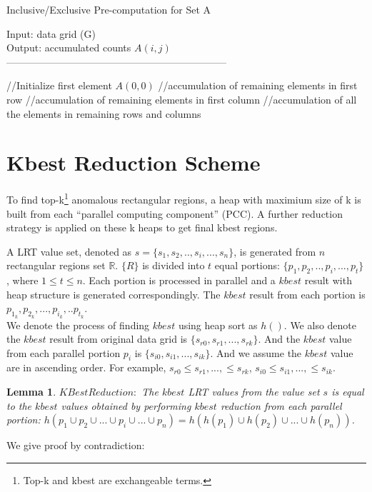 \documentclass[10pt,journal,cspaper,compsoc]{IEEEtran}
\newtheorem{lemma}{Lemma}
\begin{document}
\begin{algorithm}[t!]\small
\caption{Inclusive/Exclusive Pre-computation for Set A}\label{preinex}
Input: data grid (G) \\
Output: accumulated counts $A(i,j)$\\
------------------------------------------------------------------ \\
\begin{algorithmic}[1]
\STATE //Initialize first element $A(0,0)$
\STATE //accumulation of remaining elements in first row
\ENDFOR
\STATE //accumulation of remaining elements in first column
\ENDFOR
\STATE //accumulation of all the elements in remaining rows and columns
\ENDFOR
{}
\ENDFOR
\ENDFOR
\end{algorithmic}
\end{algorithm}


\section{ Kbest Reduction Scheme}\label{KBEST}
To find top-k\footnote{Top-k and kbest are exchangeable terms.} anomalous rectangular regions, a heap with maximium size of k is built from each ``parallel computing component'' (PCC). A further reduction strategy is applied on these k heaps to get final kbest regions.

A LRT value set, denoted as $s=\{s_1,s_2, .., s_i,...,s_n\}$, is generated from $n$ rectangular regions set $\mathbb{R}$. $\{R\}$ is divided into $t$ equal portions: $\{p_1,p_2,..,p_i,...,p_t\}$, where $1\le t\le n$. Each portion is processed in parallel and a $kbest$ result with heap structure is generated correspondingly. The $kbest$ result from each portion is $p_{1_k},p_{2_k},...,p_{i_k},..p_{t_k}$.\\ We denote the process of finding $kbest$ using heap sort as $h()$. We also denote the $kbest$ result from original data grid is $\{s_{r0},s_{r1},...,s_{rk}\}$. And the $kbest$ value from each parallel portion $p_i$ is $\{s_{i0},s_{i1},...,s_{ik}\}$. And we assume the $kbest$ value are in ascending order. For example, $s_{r0}\le s_{r1},...,\le s_{rk}$, $s_{i0}\le s_{i1},...,\le s_{ik}$.
\begin{lemma}{\bf $KBestReduction:$} The $kbest$ LRT values from the value set ${s}$ is equal to the $kbest$ values obtained by performing $kbest$ reduction from each parallel portion:
$h(p_1\cup p_2\cup ...\cup p_i \cup...\cup p_n)=h(h(p_1)\cup h(p_2)\cup ...\cup h(p_n))$.
\end{lemma}
We give proof by contradiction:
\end{document}
